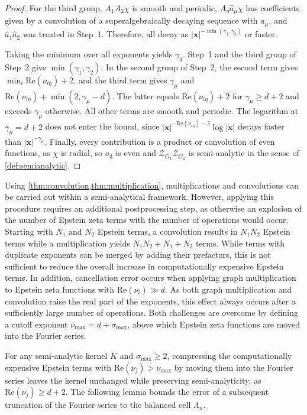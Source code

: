 \documentclass[]{amsart}
\numberwithin{mythm}{section}
\begin{document}
\begin{proof}
For the third group, $A_1A_2\chi$ is smooth and periodic, $A_\eta \hat a_\mu\chi$ has
coefficients given by a convolution of a superalgebraically decaying sequence with
$a_\mu$, and $\hat a_1 \hat a_2$ was treated in Step~1. Therefore, all decay as
$|\bm x|^{-\min(\gamma_1,\gamma_2)}$ or faster.

Taking the minimum over all exponents yields $\gamma_3$. Step~1 and the third group of Step~2 give $\min(\gamma_1,\gamma_2)$. In the second group of Step~2, the second term gives $\min_i\mathrm{Re}(\nu_{i\eta})+2$, and the third term gives $\gamma_\mu$ and $\mathrm{Re}(\nu_{i\eta})+\min(2,\gamma_\mu-d)$. The latter equals $\mathrm{Re}(\nu_{i\eta})+2$ for $\gamma_\mu\ge d+2$ and exceeds $\gamma_\mu$ otherwise. All other terms are smooth and periodic. The logarithm at $\gamma_\mu=d+2$ does not enter the bound, since $|\bm x|^{-\mathrm{Re}(\nu_{i\eta})-2}\log|\bm x|$ decays faster than $|\bm x|^{-\gamma_\mu}$.
Finally, every contribution is a product or convolution of even functions, as $\chi$ is radial, so $a_3$ is even and $\mathcal Z_{G_1}\mathcal Z_{G_2}$ is semi-analytic in the sense of \cref{def:semianalytic}.
\end{proof}

Using \cref{thm:convolution,thm:multiplication}, multiplications and convolutions can be carried out within a semi-analytical framework. However, applying this procedure requires an additional postprocessing step, as otherwise an explosion of the number of Epstein zeta terms with the number of operations would occur. Starting with $N_1$ and $N_2$ Epstein terms, a convolution results in $N_1 N_2$ Epstein terms while a multiplication yields $N_1 N_2 +N_1+N_2$ terms. While terms with duplicate exponents can be merged by adding their prefactors, this is not sufficient to reduce the overall increase in computationally expensive Epstein terms. In addition, cancellation error occurs when applying graph multiplication to Epstein zeta functions with $\mathrm{Re}(\nu_i)\gg d$. As both graph multiplication and convolution raise the real part of the exponents, this effect always occurs after a sufficiently large number of operations. Both challenges are overcome by defining a cutoff exponent $\nu_\mathrm{max}=d+\sigma_\mathrm{max}$, above which Epstein zeta functions are moved into the Fourier series. 

For any semi-analytic kernel $K$ and $\sigma_\mathrm{max}\ge2$, compressing the computationally expensive Epstein terms with $\mathrm{Re}(\nu_j)>\nu_\mathrm{max}$ by moving them into the Fourier series leaves the kernel unchanged while preserving semi-analyticity, as $\mathrm{Re}(\nu_j)\ge d+2$. The following lemma bounds the error of a subsequent truncation of the Fourier series to the balanced cell $\Lambda_n$.
\end{document}
